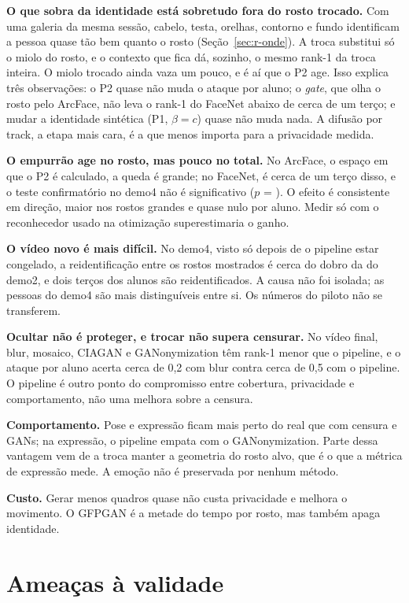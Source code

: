 \textbf{O que sobra da identidade está sobretudo fora do rosto trocado.} Com uma galeria da mesma sessão, cabelo, testa, orelhas, contorno e fundo identificam a pessoa quase tão bem quanto o rosto (Seção~\ref{sec:r-onde}). A troca substitui só o miolo do rosto, e o contexto que fica dá, sozinho, o mesmo rank-1 da troca inteira. O miolo trocado ainda vaza um pouco, e é aí que o P2 age. Isso explica três observações: o P2 quase não muda o ataque por aluno; o \emph{gate}, que olha o rosto pelo ArcFace, não leva o rank-1 do FaceNet abaixo de cerca de um terço; e mudar a identidade sintética (P1, $\beta = c$) quase não muda nada. A difusão por track, a etapa mais cara, é a que menos importa para a privacidade medida.

\textbf{O empurrão age no rosto, mas pouco no total.} No ArcFace, o espaço em que o P2 é calculado, a queda é grande; no FaceNet, é cerca de um terço disso, e o teste confirmatório no demo4 não é significativo ($p$ = ). O efeito é consistente em direção, maior nos rostos grandes e quase nulo por aluno. Medir só com o reconhecedor usado na otimização superestimaria o ganho.

\textbf{O vídeo novo é mais difícil.} No demo4, visto só depois de o pipeline estar congelado, a reidentificação entre os rostos mostrados é cerca do dobro da do demo2, e dois terços dos alunos são reidentificados. A causa não foi isolada; as pessoas do demo4 são mais distinguíveis entre si. Os números do piloto não se transferem.

\textbf{Ocultar não é proteger, e trocar não supera censurar.} No vídeo final, blur, mosaico, CIAGAN e GANonymization têm rank-1 menor que o pipeline, e o ataque por aluno acerta cerca de 0,2 com blur contra cerca de 0,5 com o pipeline. O pipeline é outro ponto do compromisso entre cobertura, privacidade e comportamento, não uma melhora sobre a censura.

\textbf{Comportamento.} Pose e expressão ficam mais perto do real que com censura e GANs; na expressão, o pipeline empata com o GANonymization. Parte dessa vantagem vem de a troca manter a geometria do rosto alvo, que é o que a métrica de expressão mede. A emoção não é preservada por nenhum método.

\textbf{Custo.} Gerar menos quadros quase não custa privacidade e melhora o movimento. O GFPGAN é a metade do tempo por rosto, mas também apaga identidade.

\section{Ameaças à validade}
\label{sec:ameacas-validade}


